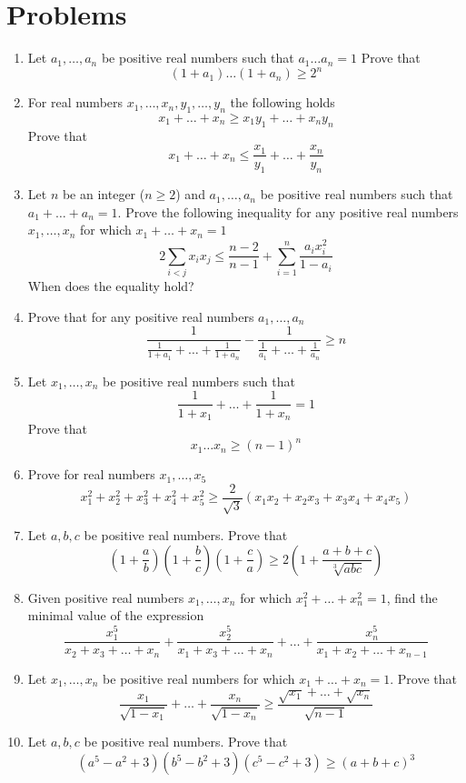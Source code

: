 \documentclass{article}
\begin{document}
	\newpage
\section*{Problems}
	\begin{enumerate}
	\item %
	Let $a_1,\dots,a_n$ be positive real numbers such that $a_1\dots a_n =1$ Prove that 
	$$(1+a_1)\dots (1+a_n) \geq 2^n$$
	\item %
	For real numbers $x_1, \dots , x_n, y_1, \dots , y_n$ the following holds
	$$x_1+\dots+x_n \geq x_1y_1 + \dots + x_ny_n$$
	Prove that
	$$x_1+\dots+x_n \leq \frac{x_1}{y_1} + \dots + \frac{x_n}{y_n}$$
	
	\item %
	Let $n$ be an integer ($n\geq 2$) and $a_1,\dots,a_n$ be positive real numbers such that $a_1+\dots+a_n=1$. Prove the following inequality for any positive real numbers $x_1,\dots,x_n$ for which $x_1+\dots+x_n=1$ 
	$$2\sum_{i<j} x_ix_j \leq \frac{n-2}{n-1} + \sum_{i=1}^n \frac{a_ix_i^2}{1-a_i}$$
	When does the equality hold?
	
	\item %
	Prove that for any positive real numbers $a_1,\dots,a_n$
	$$\frac{1}{\frac{1}{1+a_1}+\dots+\frac{1}{1+a_n}} - \frac{1}{\frac{1}{a_1}+\dots+\frac{1}{a_n}} \geq n$$
	
	\item %
	Let $x_1,\dots,x_n$ be positive real numbers such that
	$$\frac{1}{1+x_1} + \dots + \frac{1}{1+x_n}=1$$
	Prove that
	$$x_1 \dots x_n \geq (n-1)^n$$
	
	\item %
	Prove for real numbers $x_1,\dots,x_5$
	$$x_1^2 + x_2^2 + x_3^2 + x_4^2 + x_5^2 \geq \frac{2}{\sqrt{3}}(x_1x_2 + x_2x_3 + x_3x_4 + x_4x_5) $$
	
	\item %
	Let $a,b,c$ be positive real numbers. Prove that
	$$\left(1+\frac{a}{b}\right) \left(1+\frac{b}{c}\right)  \left(1+\frac{c}{a}\right) \geq 
	2\left(1+\frac{a+b+c}{\sqrt[3]{abc}}\right)$$
	
	\item %
	Given positive real numbers $x_1,\dots,x_n$ for which $x_1^2+\dots+x_n^2=1$, find the minimal value of the expression
	$$\frac{x_1^5}{x_2+x_3+\dots+x_n} + \frac{x_2^5}{x_1+x_3+\dots+x_n} + \dots +\frac{x_n^5}{x_1+x_2+\dots+x_{n-1}}$$
	
	\item %
	Let $x_1,\dots,x_n$ be positive real numbers for which $x_1+\dots+x_n=1$. Prove that
	$$\frac{x_1}{\sqrt{1-x_1}} + \dots + \frac{x_n}{\sqrt{1-x_n}} 
	\geq
	\frac{\sqrt{x_1}+\dots+\sqrt{x_n}}{\sqrt{n-1}} $$
	
	\item %
	Let $a,b,c$ be positive real numbers. Prove that
	$$(a^5-a^2+3)(b^5-b^2+3)(c^5-c^2+3)\geq (a+b+c)^3$$
	
	
	
\end{enumerate}
\end{document}
